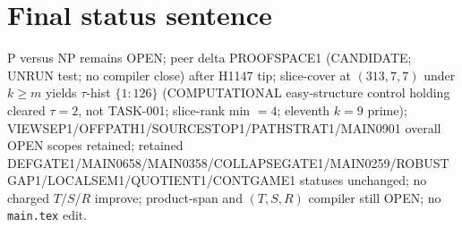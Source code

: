 \documentclass[11pt]{article}
\begin{document}
\section*{Final status sentence}
P versus NP remains OPEN; peer delta PROOFSPACE1 (CANDIDATE; UNRUN test; no compiler close) after H1147 tip; slice-cover at $(313,7,7)$ under $k{\ge}m$ yields $\tau$-hist $\{1{:}126\}$ (COMPUTATIONAL easy-structure control holding cleared $\tau{=}2$, not TASK-001; slice-rank min $=4$; eleventh $k{=}9$ prime); VIEWSEP1/OFFPATH1/SOURCESTOP1/PATHSTRAT1/MAIN0901 overall OPEN scopes retained; retained DEFGATE1/MAIN0658/MAIN0358/COLLAPSEGATE1/MAIN0259/ROBUSTGAP1/LOCALSEM1/QUOTIENT1/CONTGAME1 statuses unchanged; no charged $T$/$S$/$R$ improve; product-span and $(T,S,R)$ compiler still OPEN; no \texttt{main.tex} edit.
\end{document}
